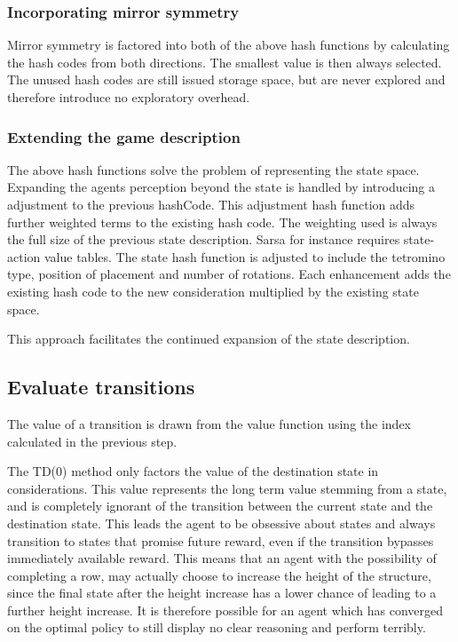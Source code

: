 \documentclass{rucsthesis}
\begin{document}
\subsubsection{Incorporating mirror symmetry}

Mirror symmetry is factored into both of the above hash functions by calculating the hash codes from both directions. The smallest value is then always selected. The unused hash codes are still issued storage space, but are never explored and therefore introduce no exploratory overhead.

\subsubsection{Extending the game description}

The above hash functions solve the problem of representing the state space. Expanding the agents perception beyond the state is handled by introducing a adjustment to the previous hashCode. This adjustment hash function adds further weighted terms to the existing hash code. The weighting used is always the full size of the previous state description. Sarsa for instance requires state-action value tables. The state hash function is adjusted to include the tetromino type, position of placement and number of rotations. Each enhancement adds the existing hash code to the new consideration multiplied by the existing state space.

This approach facilitates the continued expansion of the state description. 
 
\subsection{Evaluate transitions}

The value of a transition is drawn from the value function using the index calculated in the previous step.

The TD(0) method only factors the value of the destination state in considerations. This value represents the long term value stemming from a state, and is completely ignorant of the transition between the current state and the destination state. This leads the agent to be obsessive about states and always transition to states that promise future reward, even if the transition bypasses immediately available reward. This means that an agent with the possibility of completing a row, may actually choose to increase the height of the structure, since the final state after the height increase has a lower chance of leading to a further height increase. It is therefore possible for an agent which has converged on the optimal policy to still display no clear reasoning and perform terribly. 
\end{document}

